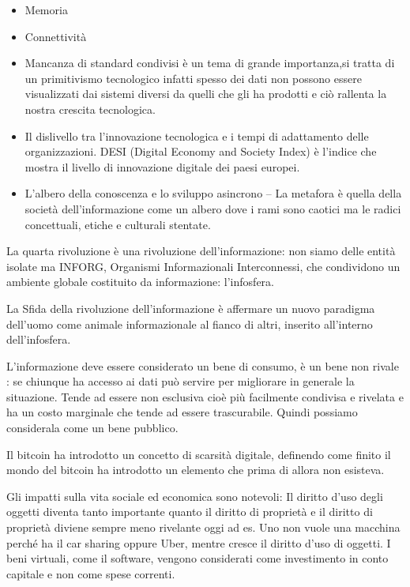 \documentclass[a4page, 11pt]{article}
\begin{document}
\begin{itemize}
	 
	\item
	Memoria
	\item
	Connettività
	\item
	Mancanza di standard condivisi è un tema di grande importanza,si 
	tratta di un primitivismo tecnologico infatti
	spesso dei dati non possono essere visualizzati dai sistemi diversi da
	quelli che gli ha prodotti e ciò rallenta la nostra crescita
	tecnologica. 
	\item
	Il dislivello tra l'innovazione tecnologica e i tempi di adattamento
	delle organizzazioni. DESI (Digital Economy and Society Index) è
	l'indice che mostra il livello di innovazione digitale dei paesi
	europei.
	\item
	L'albero della conoscenza e lo sviluppo asincrono -- La metafora è
	quella della società dell'informazione come un albero dove i rami sono
	caotici ma le radici concettuali, etiche e culturali stentate.
\end{itemize}

La quarta rivoluzione è una rivoluzione dell'informazione: non siamo
delle entità isolate ma INFORG, Organismi Informazionali Interconnessi,
che condividono un ambiente globale costituito da informazione:
l'infosfera.

La Sfida della rivoluzione dell'informazione è affermare un nuovo
paradigma dell'uomo come animale informazionale al fianco di altri,
inserito all'interno dell'infosfera.

L'informazione deve essere considerato un bene di consumo, è un bene non
rivale : se chiunque ha accesso ai dati può servire per migliorare in
generale la situazione. Tende ad essere non esclusiva cioè più
facilmente condivisa e rivelata e ha un costo marginale che tende ad
essere trascurabile. Quindi possiamo considerala come un bene pubblico.

Il bitcoin ha introdotto un concetto di scarsità digitale, definendo
come finito il mondo del bitcoin ha introdotto un elemento che prima di
allora non esisteva.

Gli impatti sulla vita sociale ed economica sono notevoli: Il diritto
d'uso degli oggetti diventa tanto importante quanto il diritto di
proprietà e il diritto di proprietà diviene sempre meno rivelante oggi
ad es. Uno non vuole una macchina perché ha il car sharing oppure Uber,
mentre cresce il diritto d'uso di oggetti. I beni virtuali, come il
software, vengono considerati come investimento in conto capitale e non
come spese correnti.
\end{document}
